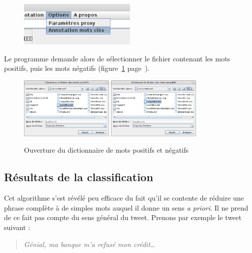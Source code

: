 \documentclass[12pt,a4paper]{report}
\begin{document}
\begin{figure}[h]
	\centering
	\includegraphics[width=0.5\textwidth]{img/capture_menumotcle.png}
\end{figure}

Le programme demande alors de sélectionner le fichier contenant les mots
positifs, puis les mots négatifs (figure~\ref{ouvrir_dictionnaire}
page~\pageref{ouvrir_dictionnaire}).

\begin{figure}[h]
	\centering
	\includegraphics[width=0.4\textwidth]{img/capture_ouvrir-mots-positifs.png}
	\includegraphics[width=0.4\textwidth]{img/capture_ouvrir-mots-negatifs.png}
	\caption{Ouverture du dictionnaire de mots positifs et négatifs}
	\label{ouvrir_dictionnaire}
\end{figure}

\newpage
\subsection{Résultats de la classification}
Cet algorithme s'est révélé peu efficace du fait qu'il se contente de réduire
une phrase complète à de simples mots auquel il donne un sens \textit{a priori}.
Il ne prend de ce fait pas compte du sens général du tweet. Prenons par exemple
le tweet suivant :

\begin{quote}
	\textit{Génial, ma banque m'a refusé mon crédit…}
\end{quote}
\end{document}

